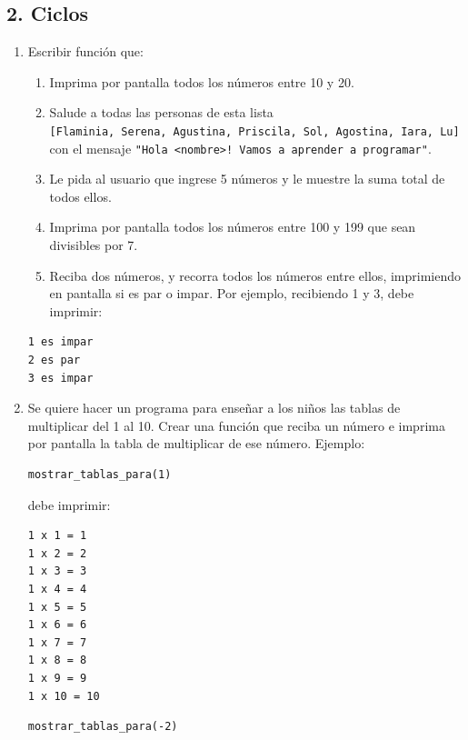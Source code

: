 \documentclass[
  letterpaper,
  DIV=11,
  numbers=noendperiod]{scrreprt}
\providecommand{\tightlist}{%
  \setlength{\itemsep}{0pt}\setlength{\parskip}{0pt}}\usepackage{longtable,booktabs,array}
\begin{document}
\subsection*{2. Ciclos}\label{ciclos-1}

\begin{enumerate}
\def\labelenumi{\arabic{enumi}.}
\item
  Escribir función que:

  \begin{enumerate}
  \def\labelenumii{\alph{enumii}.}
  \tightlist
  \item
    Imprima por pantalla todos los números entre 10 y 20.
  \item
    Salude a todas las personas de esta lista
    \texttt{{[}Flaminia,\ Serena,\ Agustina,\ Priscila,\ Sol,\ Agostina,\ Iara,\ Lu{]}}
    con el mensaje
    \texttt{"Hola\ \textless{}nombre\textgreater{}!\ Vamos\ a\ aprender\ a\ programar"}.
  \item
    Le pida al usuario que ingrese 5 números y le muestre la suma total
    de todos ellos.
  \item
    Imprima por pantalla todos los números entre 100 y 199 que sean
    divisibles por 7.
  \item
    Reciba dos números, y recorra todos los números entre ellos,
    imprimiendo en pantalla si es par o impar. Por ejemplo, recibiendo 1
    y 3, debe imprimir:
  \end{enumerate}

\begin{verbatim}
1 es impar
2 es par
3 es impar
\end{verbatim}
\item
  Se quiere hacer un programa para enseñar a los niños las tablas de
  multiplicar del 1 al 10. Crear una función que reciba un número e
  imprima por pantalla la tabla de multiplicar de ese número. Ejemplo:

\begin{verbatim}
mostrar_tablas_para(1)
\end{verbatim}

  debe imprimir:

\begin{verbatim}
1 x 1 = 1
1 x 2 = 2
1 x 3 = 3
1 x 4 = 4
1 x 5 = 5
1 x 6 = 6
1 x 7 = 7
1 x 8 = 8
1 x 9 = 9
1 x 10 = 10
\end{verbatim}

\begin{verbatim}
mostrar_tablas_para(-2)
\end{verbatim}


\end{enumerate}
\end{document}
